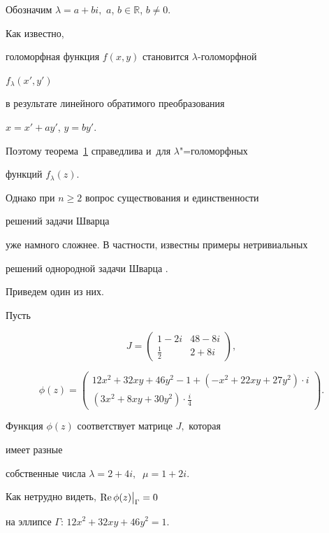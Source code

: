 \smallskip



 Обозначим $\lambda=a+bi,$ $a$, $b\in\mathbb{R}$, $b\ne 0.$ 

 Как известно,

 голоморфная  функция $f(x,y)$ становится $\lambda$-голоморфной

 $f_\lambda(x',y')$

  в результате  линейного  обратимого преобразования

  $x=x'+ay'$, $y=by'.$

  Поэтому теорема~\hyperlink{nik:th1}{1} справедлива и~для $\lambda$"=голоморфных

  функций $f_\lambda(z).$





Однако  при $n\ge 2$ вопрос существования  и единственности

решений задачи Шварца

уже намного сложнее. В частности, известны примеры нетривиальных

решений однородной задачи Шварца \cite{15Nk-Nk2}.

Приведем один из них.



\smallskip



\begin{example}[1]Пусть

$$

J=\left(\begin{array}{lr}

1-2i& 48-8i \\

\frac{\textstyle 1}{\textstyle 2}&2+8i

\end{array}\right),

$$

$$

\phi(z)=

\left(\begin{array}{r}

12x^2+32xy+46y^2-1+(-x^2+22xy+27y^2)\cdot i\\

(3x^2+8xy+30y^2)\cdot\frac{\textstyle i}{\textstyle 4}

\end{array}\right).

$$





Функция $\phi(z)$ соответствует матрице $J,$ которая

        имеет  разные

        собственные числа $\lambda=2+4i,~$ $\mu=1+2i.$

Как нетрудно видеть, ${\rm Re}\,\phi(z)\bigr|_{\Gamma}=0$

       на эллипсе $\Gamma$: $12x^2+32xy+46y^2=1.$

\end{example}



